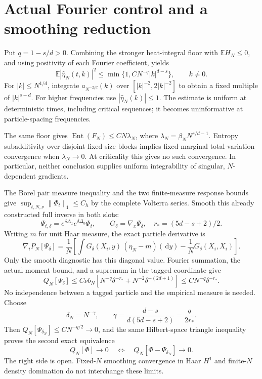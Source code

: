 \documentclass[10pt]{article}
\newcommand{\E}{\mathbb E}
\newcommand{\dd}{\,\mathrm d}
\begin{document}
\newpage
\section*{Actual Fourier control and a smoothing reduction}
Put $q=1-s/d>0$. Combining the stronger heat-integral floor with
$\E H_N\le0$, and using positivity of each Fourier coefficient, yields
\[
 \E|\widehat\eta_N(t,k)|^2
 \le\min\{1,CN^{-q}|k|^{d-s}\},\qquad k\ne0.
\]
For $|k|\le N^{1/d}$, integrate $a_{N^{-2/d}}(k)$ over
$[|k|^{-2},2|k|^{-2}]$ to obtain a fixed multiple of $|k|^{s-d}$.
For higher frequencies use $|\widehat\eta_N(k)|\le1$. The estimate is uniform
at deterministic times, including critical sequences; it becomes
uninformative at particle-spacing frequencies.

The same floor gives $\operatorname{Ent}(F_N)\le CN\lambda_N$, where
$\lambda_N=\beta_NN^{s/d-1}$. Entropy subadditivity over disjoint fixed-size
blocks implies fixed-marginal total-variation convergence when
$\lambda_N\to0$. At criticality this gives no such convergence. In
particular, neither conclusion supplies uniform integrability of singular,
$N$-dependent gradients.

The Borel pair measure inequality and the two finite-measure response
bounds give $\sup_{t,N,\nu}\|\Phi_t\|_1\le C_h$ by the complete Volterra
series. Smooth this already constructed full inverse in both slots:
\[
 \Psi_{t,\delta}=e^{\delta\Delta_x}e^{\delta\Delta_y}\Phi_t,
 \qquad G_\delta=\nabla_x\Psi_\delta,
 \quad r_*=(5d-s+2)/2.
\]
Writing $m$ for unit Haar measure, the exact particle derivative is
\[
 \nabla_iP_N[\Psi_\delta]
 =\frac1N\left[\int G_\delta(X_i,y)\,(\eta_N-m)(\dd y)
                    -\frac1N G_\delta(X_i,X_i)\right].
\]
Only the smooth diagnostic has this diagonal value. Fourier summation, the
actual moment bound, and a supremum in the tagged coordinate give
\[
 Q_N[\Psi_\delta]
 \le C\nu b_N\left[N^{-q}\delta^{-r_*}
                         +N^{-2}\delta^{-(2d+1)}\right]
 \le CN^{-q}\delta^{-r_*}.
\]
No independence between a tagged particle and the empirical measure is
needed. Choose
\[
 \delta_N=N^{-\gamma},\qquad
 \gamma=\frac{d-s}{d(5d-s+2)}=\frac{q}{2r_*}.
\]
Then $Q_N[\Psi_{\delta_N}]\le CN^{-q/2}\to0$, and the same Hilbert-space
triangle inequality proves the second exact equivalence
\[
 Q_N[\Phi]\longrightarrow0
 \quad\Longleftrightarrow\quad
 Q_N[\Phi-\Psi_{\delta_N}]\longrightarrow0.
 \tag{B}
\]
The right side is open. Fixed-$N$ smoothing convergence in Haar $H^1$ and
finite-$N$ density domination do not interchange these limits.
\end{document}
